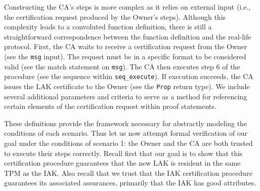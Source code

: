 Constructing the CA's steps is more complex as it relies on external input (i.e., the certification request produced by the Owner's steps). Although this complexity leads to a convoluted function definition, there is still a straightforward correspondence between the function definition and the real-life protocol. First, the CA waits to receive a certification request from the Owner (see the \verb|msg| input). The request must be in a specific format to be considered valid (see the match statement on \verb|msg|). The CA then executes step 6 of the procedure (see the sequence within \verb|seq_execute|). If execution succeeds, the CA issues the LAK certificate to the Owner (see the \verb|Prop| return type). We include several additional parameters and criteria to serve as a method for referencing certain elements of the certification request within proof statements.



These definitions provide the framework necessary for abstractly modeling the conditions of each scenario. 
Thus let us now attempt formal verification of our goal under the conditions of scenario 1: the Owner and the CA are both trusted to execute their steps correctly. Recall first that our goal is to show that this certification procedure guarantees that the new LAK is resident in the same TPM as the IAK. Also recall that we trust that the IAK certification procedure guarantees its associated assurances, primarily that the IAK has good attributes. 

